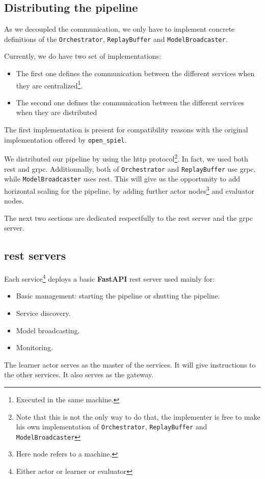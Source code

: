 \subsection{Distributing the pipeline}
As we decoupled the communication, we only have to implement concrete definitions of the \texttt{Orchestrator}, \texttt{ReplayBuffer} and \texttt{ModelBroadcaster}.

Currently, we do have two set of implementations:
\begin{itemize}
	\item The first one defines the communication between the different services when they are centralized\footnote{Executed in the same machine.}.
	\item The second one defines the communication between the different services when they are distributed
\end{itemize}
The first implementation is present for compatibility reasons with the original implementation offered by \texttt{open\_spiel}. 

We distributed our pipeline by using the \acrshort{http} protocol\footnote{Note that this is not the only way to do that, the implementer is free to make his own implementation of \texttt{Orchestrator}, \texttt{ReplayBuffer} and \texttt{ModelBroadcaster}}. In fact, we used both \acrshort{rest} and \acrshort{grpc}.
Additionnally, both of \texttt{Orchestrator} and \texttt{ReplayBuffer} use \acrshort{grpc}, while \texttt{ModelBroadcaster} uses \acrshort{rest}. This will give us the opportunity to add horizontal scaling for the pipeline, by adding further actor nodes\footnote{Here node refers to a machine.} and evaluator nodes.

The next two sections are dedicated respectfully to the \acrshort{rest} server and the \acrshort{grpc} server.
\subsection{\acrshort{rest} servers}
Each service\footnote{Either actor or learner or evaluator} deploys a basic \textbf{FastAPI} \acrfull{rest} server used mainly for: 
\begin{itemize}
	\item Basic management: starting the pipeline or shutting the pipeline.
	\item Service discovery.
	\item Model broadcasting.
	\item Monitoring.
\end{itemize}
The learner actor serves as the master of the services. It will give instructions to the other services. It also serves as the gateway.

